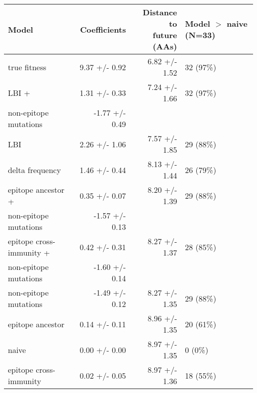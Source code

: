 \begin{tabular*}{0.85\textwidth}{lrrl}
\toprule
                             Model &    Coefficients & \makecell{Distance to \\ future (AAs)} & \makecell[l]{Model $>$ naive \\ (N=33)} \\
\midrule
                      true fitness &   9.37 +/- 0.92 &                          6.82 +/- 1.52 &                               32 (97\%) \\
                             LBI + &   1.31 +/- 0.33 &                          7.24 +/- 1.66 &                               32 (97\%) \\
 \hspace{3mm}non-epitope mutations &  -1.77 +/- 0.49 &                                        &                                         \\
                               LBI &   2.26 +/- 1.06 &                          7.57 +/- 1.85 &                               29 (88\%) \\
                   delta frequency &   1.46 +/- 0.44 &                          8.13 +/- 1.44 &                               26 (79\%) \\
                epitope ancestor + &   0.35 +/- 0.07 &                          8.20 +/- 1.39 &                               29 (88\%) \\
 \hspace{3mm}non-epitope mutations &  -1.57 +/- 0.13 &                                        &                                         \\
          epitope cross-immunity + &   0.42 +/- 0.31 &                          8.27 +/- 1.37 &                               28 (85\%) \\
 \hspace{3mm}non-epitope mutations &  -1.60 +/- 0.14 &                                        &                                         \\
             non-epitope mutations &  -1.49 +/- 0.12 &                          8.27 +/- 1.35 &                               29 (88\%) \\
                  epitope ancestor &   0.14 +/- 0.11 &                          8.96 +/- 1.35 &                               20 (61\%) \\
                             naive &   0.00 +/- 0.00 &                          8.97 +/- 1.35 &                                 0 (0\%) \\
            epitope cross-immunity &   0.02 +/- 0.05 &                          8.97 +/- 1.36 &                               18 (55\%) \\
\bottomrule
\end{tabular*}
